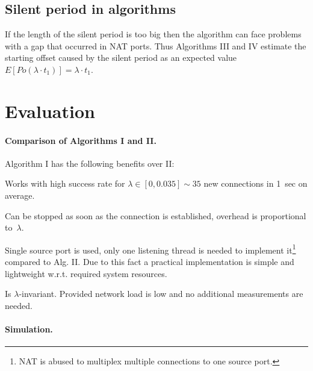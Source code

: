 \documentclass{llncs}
\begin{document}
\subsection{Silent period in algorithms} If the length of the silent period is too big then
the algorithm can face problems with a gap that occurred in NAT ports. Thus 
Algorithms III and IV estimate the starting offset caused by the silent period as an
expected value $E[Po(\lambda \cdot t_1)] = \lambda\cdot t_1$.

\section{Evaluation}

\paragraph{Comparison of Algorithms I and II.} 
Algorithm I has the following benefits over II:
\begin{compactitem}
 \item Works with high success rate for $\lambda \in [0, 0.035] \sim 35$ new connections in 1~sec on average.
 \item Can be stopped as soon as the connection is established, overhead is proportional to~$\lambda$.
 \item Single source port is used, only one listening thread is needed to implement
it\footnote{NAT is abused to multiplex multiple connections to one source port.} compared to Alg. II.
Due to this fact a practical implementation is simple and lightweight w.r.t. required system resources.
 \item Is $\lambda$-invariant. Provided network load is low and no additional measurements are needed.
\end{compactitem}

\paragraph{Simulation.}
\end{document}
